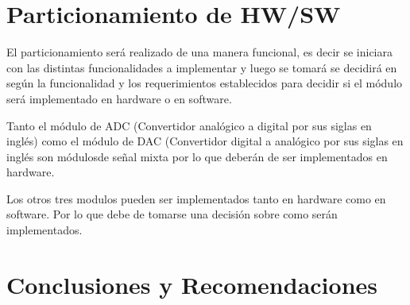 \documentclass[10pt, letterpaper, conference]{IEEEtran}
\begin{document}
\section{Particionamiento de HW/SW}
\label{sec:partitioning}

El particionamiento será realizado de una manera funcional, es decir se iniciara con las distintas
funcionalidades a implementar y luego se tomará se decidirá en según la funcionalidad y los
requerimientos establecidos para decidir si el módulo será implementado en hardware o en software.

Tanto el módulo de ADC (Convertidor analógico a digital por sus siglas en inglés) como el módulo de DAC
(Convertidor digital a analógico por sus siglas en inglés son módulosde señal mixta por lo que deberán
de ser implementados en hardware.

Los otros tres modulos pueden ser implementados tanto en hardware como en software. Por lo que debe de
tomarse una decisión sobre como serán implementados. %


\section{Conclusiones y Recomendaciones}





 

\end{document}
